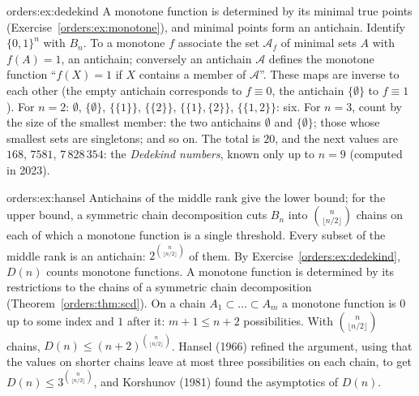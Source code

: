 \begin{solution}{orders:ex:dedekind}
\idea A monotone function is determined by its minimal true points (Exercise~\ref{orders:ex:monotone}), and minimal points form an antichain.
\writeup Identify $\{0,1\}^n$ with $B_n$. To a monotone $f$ associate the set $\mathcal A_f$ of minimal sets $A$ with $f(A)=1$, an antichain; conversely an
antichain $\mathcal A$ defines the monotone function ``$f(X)=1$ if $X$ contains a member of $\mathcal A$''. These maps are inverse to each other (the
empty antichain corresponds to $f\equiv0$, the antichain $\{\emptyset\}$ to $f\equiv1$). For $n=2$: $\emptyset$, $\{\emptyset\}$, $\{\{1\}\}$, $\{\{2\}\}$, $\{\{1\},\{2\}\}$,
$\{\{1,2\}\}$: six. For $n=3$, count by the size of the smallest member: the two antichains $\emptyset$ and $\{\emptyset\}$; those whose smallest
sets are singletons; and so on. The total is $20$, and the next values are $168$, $7581$, $7\,828\,354$: the \emph{Dedekind numbers}, known
only up to $n=9$ (computed in 2023).
\end{solution}

\begin{solution}{orders:ex:hansel}
\idea Antichains of the middle rank give the lower bound; for the upper bound, a symmetric chain decomposition cuts $B_n$ into
$\binom n{\lfloor n/2\rfloor}$ chains on each of which a monotone function is a single threshold.
\writeup Every subset of the middle rank is an antichain: $2^{\binom n{\lfloor n/2\rfloor}}$ of them. By Exercise~\ref{orders:ex:dedekind}, $D(n)$ counts monotone functions. A
monotone function is determined by its restrictions to the chains of a symmetric chain decomposition
(Theorem~\ref{orders:thm:scd}). On a chain $A_1\subset\dots\subset A_m$ a monotone function is $0$ up to some index and $1$ after it: $m+1\le n+2$ possibilities. With
$\binom n{\lfloor n/2\rfloor}$ chains, $D(n)\le(n+2)^{\binom n{\lfloor n/2\rfloor}}$. Hansel (1966) refined the argument, using that the values on shorter chains leave at most
three possibilities on each chain, to get $D(n)\le3^{\binom n{\lfloor n/2\rfloor}}$, and Korshunov (1981) found the asymptotics of $D(n)$.
\end{solution}

